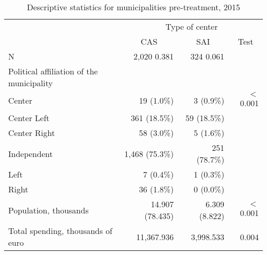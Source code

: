 
\begin{table}[H]
\fontsize{8}{7.2}\selectfont
\renewcommand{\arraystretch}{1.6}
\caption{Descriptive statistics for municipalities pre-treatment, 2015}
\centering
\begin{tabular}{llll}
\cline{1-4}
\multicolumn{1}{r}{} &
  \multicolumn{3}{c}{Type of center} \\
\multicolumn{1}{r}{} &
  \multicolumn{1}{c}{CAS} &
  \multicolumn{1}{c}{SAI} &
  \multicolumn{1}{c}{Test} \\
\cline{1-4}
\multicolumn{1}{l}{N} &
  \multicolumn{1}{r}{2,020 0.381} &
  \multicolumn{1}{r}{324 0.061} &
  \multicolumn{1}{r}{} \\
\multicolumn{1}{l}{Political affiliation of the municipality} &
  \multicolumn{1}{r}{} &
  \multicolumn{1}{r}{} &
  \multicolumn{1}{r}{} \\
\multicolumn{1}{l}{\hspace{1em}Center} &
  \multicolumn{1}{r}{19 (1.0\%)} &
  \multicolumn{1}{r}{3 (0.9\%)} &
  \multicolumn{1}{r}{$<$0.001} \\
\multicolumn{1}{l}{\hspace{1em}Center Left} &
  \multicolumn{1}{r}{361 (18.5\%)} &
  \multicolumn{1}{r}{59 (18.5\%)} &
  \multicolumn{1}{r}{} \\
\multicolumn{1}{l}{\hspace{1em}Center Right} &
  \multicolumn{1}{r}{58 (3.0\%)} &
  \multicolumn{1}{r}{5 (1.6\%)} &
  \multicolumn{1}{r}{} \\
\multicolumn{1}{l}{\hspace{1em}Independent} &
  \multicolumn{1}{r}{1,468 (75.3\%)} &
  \multicolumn{1}{r}{251 (78.7\%)} &
  \multicolumn{1}{r}{} \\
\multicolumn{1}{l}{\hspace{1em}Left} &
  \multicolumn{1}{r}{7 (0.4\%)} &
  \multicolumn{1}{r}{1 (0.3\%)} &
  \multicolumn{1}{r}{} \\
\multicolumn{1}{l}{\hspace{1em}Right} &
  \multicolumn{1}{r}{36 (1.8\%)} &
  \multicolumn{1}{r}{0 (0.0\%)} &
  \multicolumn{1}{r}{} \\
\multicolumn{1}{l}{Population, thousands} &
  \multicolumn{1}{r}{14.907 (78.435)} &
  \multicolumn{1}{r}{6.309 (8.822)} &
  \multicolumn{1}{r}{$<$0.001} \\
\multicolumn{1}{l}{Total spending, thousands of euro} &
  \multicolumn{1}{r}{11,367.936} &
  \multicolumn{1}{r}{3,998.533} &
  \multicolumn{1}{r}{0.004} \\

\end{tabular}
\end{table}
